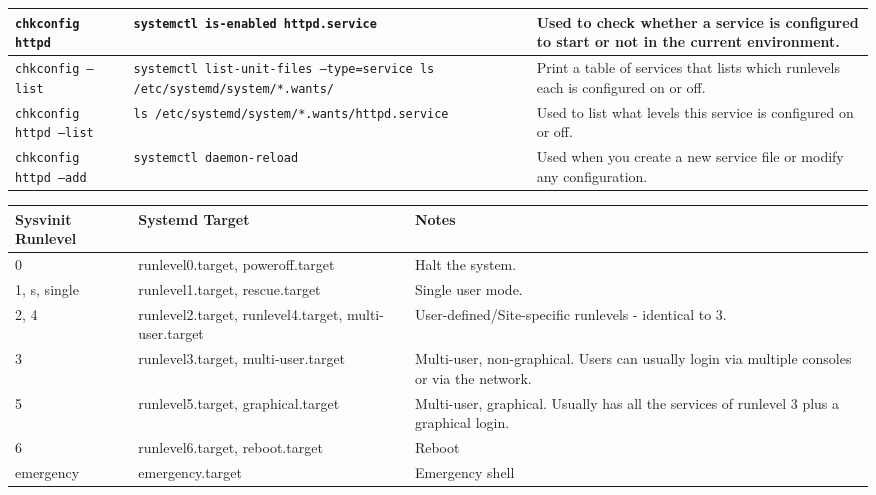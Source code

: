 \documentclass[a4paper]{article}
\begin{document}
\begin{center}
\begin{tabularx}{\textwidth}{ |l|X|X| }
\tt chkconfig httpd           & \tt systemctl is-enabled httpd.service                                                & Used to check whether a service is configured to start or not in the current environment. \\\hline
\tt chkconfig --list          & \tt systemctl list-unit-files --type=service \newline ls /etc/systemd/system/*.wants/ & Print a table of services that lists which runlevels each is configured on or off. \\\hline
\tt chkconfig httpd --list    & \tt ls /etc/systemd/system/*.wants/httpd.service                                      & Used to list what levels this service is configured on or off. \\\hline
\tt chkconfig httpd --add     & \tt systemctl daemon-reload                                                           & Used when you create a new service file or modify any configuration. \\\hline
\end{tabularx}

\vspace{6mm}

\begin{tabularx}{\textwidth}{ |l|l|X| }
\hline
\rowcolor[gray]{.8}
\bfseries Sysvinit Runlevel & \bfseries Systemd Target                              & \bfseries Notes \\\hline
0                           & runlevel0.target, poweroff.target                     & Halt the system. \\\hline
1, s, single                & runlevel1.target, rescue.target                       & Single user mode. \\\hline
2, 4                        & runlevel2.target, runlevel4.target, multi-user.target & User-defined/Site-specific runlevels - identical to 3. \\\hline
3                           & runlevel3.target, multi-user.target                   & Multi-user, non-graphical. Users can usually login via multiple consoles or via the network. \\\hline
5                           & runlevel5.target, graphical.target                    & Multi-user, graphical. Usually has all the services of runlevel 3 plus a graphical login. \\\hline
6                           & runlevel6.target, reboot.target                       & Reboot \\\hline
emergency                   & emergency.target                                      & Emergency shell \\\hline
\end{tabularx}


\end{center}
\end{document}
